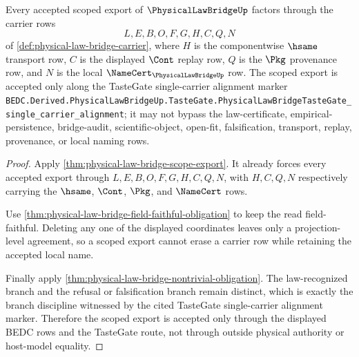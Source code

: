\begin{theorem}
\label{thm:physical-law-bridge-scoped-tastegate-route}
Every accepted scoped export of $\PhysicalLawBridgeUp$ factors through the carrier rows
$$
L,E,B,O,F,G,H,C,Q,N
$$
of \autoref{def:physical-law-bridge-carrier}, where $H$ is the componentwise $\hsame$ transport row, $C$ is the displayed $\Cont$ replay row, $Q$ is the $\Pkg$ provenance row, and $N$ is the local $\NameCert_{\PhysicalLawBridgeUp}$ row. The scoped export is accepted only along the TasteGate single-carrier alignment marker \texttt{BEDC.Derived.PhysicalLawBridgeUp.TasteGate.PhysicalLawBridgeTasteGate\_single\_carrier\_alignment}; it may not bypass the law-certificate, empirical-persistence, bridge-audit, scientific-object, open-fit, falsification, transport, replay, provenance, or local naming rows.
\end{theorem}
\begin{proof}
Apply \autoref{thm:physical-law-bridge-scope-export}. It already forces every accepted export through $L,E,B,O,F,G,H,C,Q,N$, with $H,C,Q,N$ respectively carrying the $\hsame$, $\Cont$, $\Pkg$, and $\NameCert$ rows.

Use \autoref{thm:physical-law-bridge-field-faithful-obligation} to keep the read field-faithful. Deleting any one of the displayed coordinates leaves only a projection-level agreement, so a scoped export cannot erase a carrier row while retaining the accepted local name.

Finally apply \autoref{thm:physical-law-bridge-nontrivial-obligation}. The law-recognized branch and the refusal or falsification branch remain distinct, which is exactly the branch discipline witnessed by the cited TasteGate single-carrier alignment marker. Therefore the scoped export is accepted only through the displayed BEDC rows and the TasteGate route, not through outside physical authority or host-model equality.
\end{proof}

